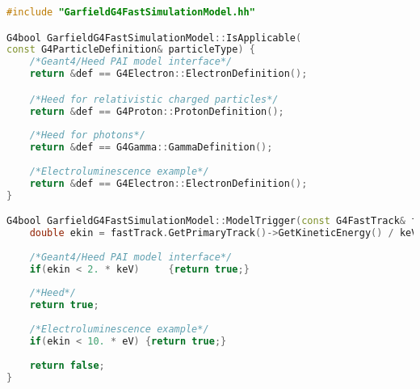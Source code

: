 \documentclass[preprint,12pt,sort&compress]{elsarticle}
\begin{document}
\newpage

\begin{lstlisting}[label=code_G4FastSimulationModel,caption=G4FastSimulationModel.,language=C++]
#include "GarfieldG4FastSimulationModel.hh"

G4bool GarfieldG4FastSimulationModel::IsApplicable(
const G4ParticleDefinition& particleType) {
	/*Geant4/Heed PAI model interface*/
	return &def == G4Electron::ElectronDefinition();

	/*Heed for relativistic charged particles*/
	return &def == G4Proton::ProtonDefinition();
	
	/*Heed for photons*/
	return &def == G4Gamma::GammaDefinition();
	
	/*Electroluminescence example*/
	return &def == G4Electron::ElectronDefinition();
}

G4bool GarfieldG4FastSimulationModel::ModelTrigger(const G4FastTrack& fastTrack) {
	double ekin = fastTrack.GetPrimaryTrack()->GetKineticEnergy() / keV;
	
	/*Geant4/Heed PAI model interface*/
	if(ekin < 2. * keV) 	{return true;}
	
	/*Heed*/
	return true;
	
	/*Electroluminescence example*/
	if(ekin < 10. * eV) {return true;}
	
	return false;
}
\end{lstlisting}

\newpage
\end{document}
